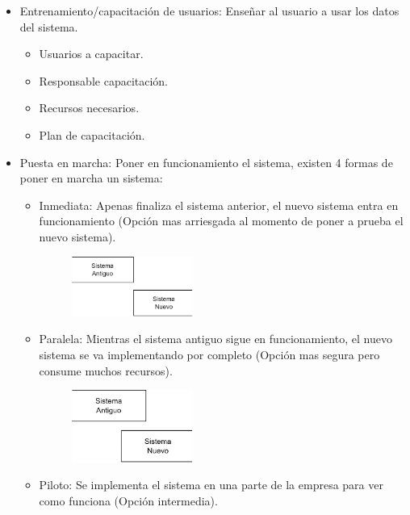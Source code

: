 \documentclass{templateNote}
\begin{document}
\begin{itemize}
\begin{itemize}
            \item Entrenamiento/capacitación de usuarios: Enseñar al usuario a usar los datos del sistema.
            \begin{itemize}
                \item Usuarios a capacitar.
                \item Responsable capacitación.
                \item Recursos necesarios.
                \item Plan de capacitación. 
            \end{itemize}
            \item Puesta en marcha: Poner en funcionamiento el sistema, existen 4 formas de poner en marcha un sistema:            
            \begin{itemize}
                \item Inmediata: Apenas finaliza el sistema anterior, el nuevo sistema entra en funcionamiento (Opción mas arriesgada al momento de poner a prueba el nuevo sistema).
                \begin{figure}[H]
                    \centering
                    \includegraphics[width=0.4\textwidth]{img/Inmediato.png}
                \end{figure}
                \item Paralela: Mientras el sistema antiguo sigue en funcionamiento, el nuevo sistema se va implementando por completo (Opción mas segura pero consume muchos recursos).
                \begin{figure}[H]
                    \centering
                    \includegraphics[width=0.4\textwidth]{img/Paralelo.png}
                \end{figure}
                \item Piloto: Se implementa el sistema en una parte de la empresa para ver como funciona (Opción intermedia).

\end{itemize}
\end{itemize}
\end{itemize}
\end{document}
